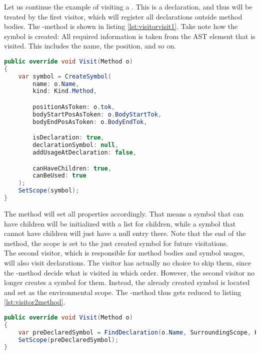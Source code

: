 Let us continue the example of visiting a .
This is a declaration, and thus will be treated by the first visitor, which will register all declarations outside method bodies.
The -method is shown in listing \ref{lst:visitorvisit1}.
Take note how the symbol is created: All required information is taken from the AST element  that is visited.
This includes the name, the position, and so on.\\

\begin{lstlisting}[language=csharp, caption={Visiting a Method, First Visitor}, captionpos=b, label={lst:visitorvisit1}]
public override void Visit(Method o)
{
    var symbol = CreateSymbol(
        name: o.Name,
        kind: Kind.Method,

        positionAsToken: o.tok,
        bodyStartPosAsToken: o.BodyStartTok,
        bodyEndPosAsToken: o.BodyEndTok,

        isDeclaration: true,
        declarationSymbol: null,
        addUsageAtDeclaration: false,

        canHaveChildren: true,
        canBeUsed: true
    );
    SetScope(symbol);
}
\end{lstlisting}

The  method will set all properties accordingly.
That means a symbol that can have children will be initialized with a list for children,
while a symbol that cannot have children will just have a null entry there.
Note that the end of the method, the scope is set to the just created symbol for future visitations.\\

The second visitor, which is responsible for method bodies and symbol usages,
will also visit declarations.
The visitor has actually no choice to skip them, since the -method decide what is visited in which order.
However, the second visitor no longer creates a symbol for them.
Instead, the already created symbol is located and set as the environmental scope.
The -method thus gets reduced to listing \ref{lst:visitor2method}.

\begin{lstlisting}[language=csharp, caption={Visiting a Method, Second Visitor}, captionpos=b, label={lst:visitor2method}]
public override void Visit(Method o)
{
    var preDeclaredSymbol = FindDeclaration(o.Name, SurroundingScope, Kind.Method);
    SetScope(preDeclaredSymbol);
}
\end{lstlisting}

